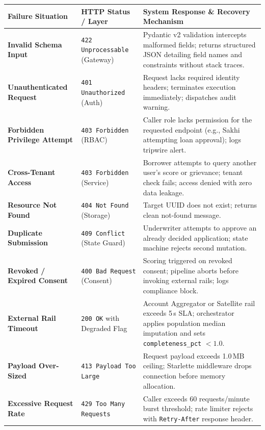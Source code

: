 \begin{table}[H]
\centering
\small
\renewcommand{\arraystretch}{1.2}
\begin{tabularx}{\textwidth}{p{3.2cm} p{3.6cm} X}
  \toprule
  \textbf{Failure Situation} & \textbf{HTTP Status / Layer} & \textbf{System Response \& Recovery Mechanism} \\
  \midrule
  \textbf{Invalid Schema Input} & \texttt{422 Unprocessable} (Gateway) & Pydantic v2 validation intercepts malformed fields; returns structured JSON detailing field names and constraints without stack traces. \\
  \addlinespace
  \textbf{Unauthenticated Request} & \texttt{401 Unauthorized} (Auth) & Request lacks required identity headers; terminates execution immediately; dispatches audit warning. \\
  \addlinespace
  \textbf{Forbidden Privilege Attempt} & \texttt{403 Forbidden} (RBAC) & Caller role lacks permission for the requested endpoint (e.g., Sakhi attempting loan approval); logs tripwire alert. \\
  \addlinespace
  \textbf{Cross-Tenant Access} & \texttt{403 Forbidden} (Service) & Borrower attempts to query another user's score or grievance; tenant check fails; access denied with zero data leakage. \\
  \addlinespace
  \textbf{Resource Not Found} & \texttt{404 Not Found} (Storage) & Target UUID does not exist; returns clean not-found message. \\
  \addlinespace
  \textbf{Duplicate Submission} & \texttt{409 Conflict} (State Guard) & Underwriter attempts to approve an already decided application; state machine rejects second mutation. \\
  \addlinespace
  \textbf{Revoked / Expired Consent} & \texttt{400 Bad Request} (Consent) & Scoring triggered on revoked consent; pipeline aborts before invoking external rails; logs compliance block. \\
  \addlinespace
  \textbf{External Rail Timeout} & \texttt{200 OK} with Degraded Flag & Account Aggregator or Satellite rail exceeds 5\,s SLA; orchestrator applies population median imputation and sets \texttt{completeness\_pct} $<1.0$. \\
  \addlinespace
  \textbf{Payload Over-Sized} & \texttt{413 Payload Too Large} & Request payload exceeds 1.0\,MB ceiling; Starlette middleware drops connection before memory allocation. \\
  \addlinespace
  \textbf{Excessive Request Rate} & \texttt{429 Too Many Requests} & Caller exceeds 60 requests/minute burst threshold; rate limiter rejects with \texttt{Retry-After} response header. \\

\end{tabularx}
\end{table}
